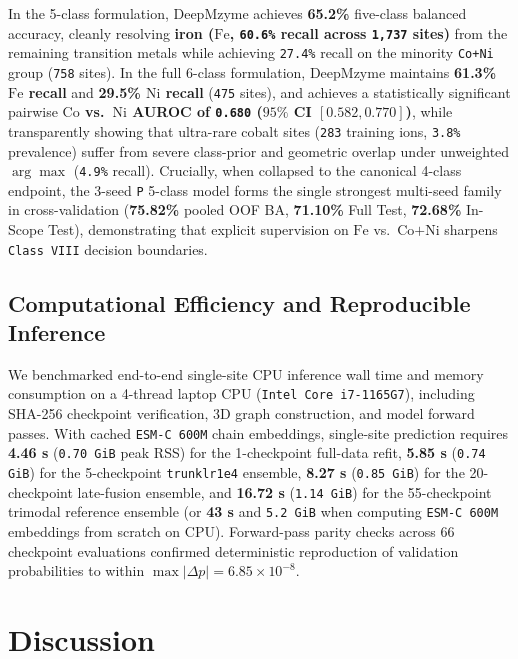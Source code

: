 \documentclass[10pt,a4paper,twocolumn]{article}
\begin{document}
In the 5-class formulation, DeepMzyme achieves \textbf{65.2\%} five-class balanced accuracy, cleanly resolving \textbf{iron ($\text{Fe}$, \texttt{60.6\%} recall across \texttt{1,737} sites)} from the remaining transition metals while achieving \texttt{27.4\%} recall on the minority \texttt{Co+Ni} group (\texttt{758} sites). In the full 6-class formulation, DeepMzyme maintains \textbf{61.3\% $\text{Fe}$ recall} and \textbf{29.5\% $\text{Ni}$ recall} (\texttt{475} sites), and achieves a statistically significant pairwise \textbf{$\text{Co}$ vs.\ $\text{Ni}$ AUROC of \texttt{0.680} ($95\%$ CI $[0.582, 0.770]$)}, while transparently showing that ultra-rare cobalt sites (\texttt{283} training ions, \texttt{3.8\%} prevalence) suffer from severe class-prior and geometric overlap under unweighted $\arg\max$ (\texttt{4.9\%} recall). Crucially, when collapsed to the canonical 4-class endpoint, the 3-seed \texttt{P} 5-class model forms the single strongest multi-seed family in cross-validation (\textbf{75.82\%} pooled OOF BA, \textbf{71.10\%} Full Test, \textbf{72.68\%} In-Scope Test), demonstrating that explicit supervision on $\text{Fe}$ vs.\ $\text{Co+Ni}$ sharpens \texttt{Class VIII} decision boundaries.

\subsection{Computational Efficiency and Reproducible Inference}

We benchmarked end-to-end single-site CPU inference wall time and memory consumption on a 4-thread laptop CPU (\texttt{Intel Core i7-1165G7}), including SHA-256 checkpoint verification, 3D graph construction, and model forward passes. With cached \texttt{ESM-C 600M} chain embeddings, single-site prediction requires \textbf{4.46 s} (\texttt{0.70 GiB} peak RSS) for the 1-checkpoint full-data refit, \textbf{5.85 s} (\texttt{0.74 GiB}) for the 5-checkpoint \texttt{trunklr1e4} ensemble, \textbf{8.27 s} (\texttt{0.85 GiB}) for the 20-checkpoint late-fusion ensemble, and \textbf{16.72 s} (\texttt{1.14 GiB}) for the 55-checkpoint trimodal reference ensemble (or \textbf{43 s} and \texttt{5.2 GiB} when computing \texttt{ESM-C 600M} embeddings from scratch on CPU). Forward-pass parity checks across 66 checkpoint evaluations confirmed deterministic reproduction of validation probabilities to within $\max |\Delta p| = 6.85 \times 10^{-8}$.

\section{Discussion}
\end{document}
